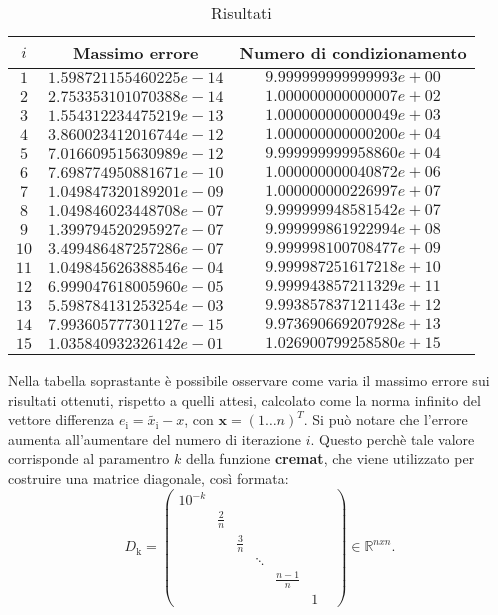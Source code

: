 \begin{table}[H]
    \caption{Risultati}
	\centering
	\begin{tabular}{|c|c|c|}
		\hline
		$i$ & Massimo errore & Numero di condizionamento \\
		\hline
		$1$ & $1.598721155460225e-14$ & $9.999999999999993e+00$ \\
		$2$ & $2.753353101070388e-14$ & $1.000000000000007e+02$ \\
		$3$ & $1.554312234475219e-13$ & $1.000000000000049e+03$ \\
		$4$ & $3.860023412016744e-12$ & $1.000000000000200e+04$ \\
		$5$ & $7.016609515630989e-12$ & $9.999999999958860e+04$ \\
		$6$ & $7.698774950881671e-10$ & $1.000000000040872e+06$ \\
		$7$ & $1.049847320189201e-09$ & $1.000000000226997e+07$ \\
		$8$ & $1.049846023448708e-07$ & $9.999999948581542e+07$ \\
		$9$ & $1.399794520295927e-07$ & $9.999999861922994e+08$ \\
		$10$ & $3.499486487257286e-07$ & $9.999998100708477e+09$ \\
        $11$ & $1.049845626388546e-04$ & $9.999987251617218e+10$ \\
        $12$ & $6.999047618005960e-05$ & $9.999943857211329e+11$ \\
        $13$ & $5.598784131253254e-03$ & $9.993857837121143e+12$ \\
        $14$ & $7.993605777301127e-15$ & $9.973690669207928e+13$ \\
        $15$ & $1.035840932326142e-01$ & $1.026900799258580e+15$ \\
		\hline
	\end{tabular}
\end{table}
Nella tabella soprastante è possibile osservare come varia il massimo errore sui risultati ottenuti, rispetto a quelli attesi, calcolato come la norma infinito del vettore differenza $e_\mathrm{i}=\widetilde{x_\mathrm{i}}-x$, con $\textbf{x}=(1 \dots n)^{T}$. Si può notare che l'errore aumenta all'aumentare del numero di iterazione $i$.
Questo perchè tale valore corrisponde al paramentro $k$ della funzione \textbf{cremat}, che viene utilizzato per costruire una matrice diagonale, così formata:
$$D_\mathrm{k}=\begin{pmatrix}
    10^{-k} & & & & & &\\
     &\frac{2}{n}& & & & \\
     & &\frac{3}{n} & & & \\
     & & &\ddots & & \\
     & & & &\frac{n-1}{n} & \\
     & & & & & 1
\end{pmatrix} \in\mathbb{R}^{nxn}. $$
